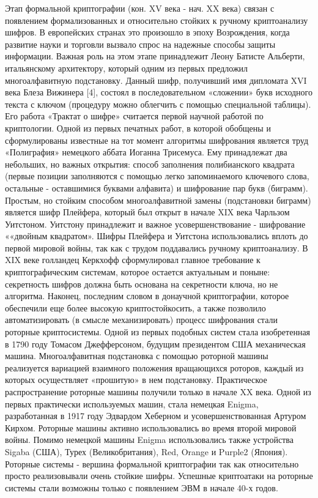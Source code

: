 Этап формальной криптографии (кон. XV века - нач. XX века) связан с появлением формализованных и относительно стойких к ручному криптоанализу шифров. В европейских странах это произошло в эпоху Возрождения, когда развитие науки и торговли вызвало спрос на надежные способы защиты информации. Важная роль на этом этапе принадлежит Леону Батисте Альберти, итальянскому архитектору, который одним из первых предложил многоалфавитную подстановку. Данный шифр, получивший имя дипломата XVI века Блеза Вижинера [4], состоял в последовательном «сложении» букв исходного текста с ключом (процедуру можно облегчить с помощью специальной таблицы). Его работа «Трактат о шифре» считается первой научной работой по криптологии. Одной из первых печатных работ, в которой обобщены и сформулированы известные на тот момент алгоритмы шифрования является труд «Полиграфия» немецкого аббата Иоганна Трисемуса. Ему принадлежат два небольших, но важных открытия: способ заполнения полибианского квадрата (первые позиции заполняются с помощью легко запоминаемого ключевого слова, остальные - оставшимися буквами алфавита) и шифрование пар букв (биграмм). Простым, но стойким способом многоалфавитной замены (подстановки биграмм) является шифр Плейфера, который был открыт в начале XIX века Чарльзом Уитстоном. Уитстону принадлежит и важное усовершенствование - шифрование ««двойным квадратом». Шифры Плейфера и Уитстона использовались вплоть до первой мировой войны, так как с трудом поддавались ручному криптоанализу. В XIX веке голландец Керкхофф сформулировал главное требование к криптографическим системам, которое остается актуальным и поныне: секретность шифров должна быть основана на секретности ключа, но не алгоритма. Наконец, последним словом в донаучной криптографии, которое обеспечили еще более высокую криптостойкосить, а также позволило автоматизировать (в смысле механизировать) процесс шифрования стали роторные криптосистемы. Одной из первых подобных систем стала изобретенная в 1790 году Томасом Джефферсоном, будущим президентом США механическая машина. Многоалфавитная подстановка с помощью роторной машины реализуется вариацией взаимного положения вращающихся роторов, каждый из которых осуществляет «прошитую» в нем подстановку. Практическое распространение роторные машины получили только в начале XX века. Одной из первых практически используемых машин, стала немецкая Enigma, разработанная в 1917 году Эдвардом Хеберном и усовершенствованная Артуром Кирхом. Роторные машины активно использовались во время второй мировой войны. Помимо немецкой машины Enigma использовались также устройства Sigaba (США), Турех (Великобритания), Red, Orange и Purple2 (Япония). Роторные системы - вершина формальной криптографии так как относительно просто реализовывали очень стойкие шифры. Успешные криптоатаки на роторные системы стали возможны только с появлением ЭВМ в начале 40-х годов.

